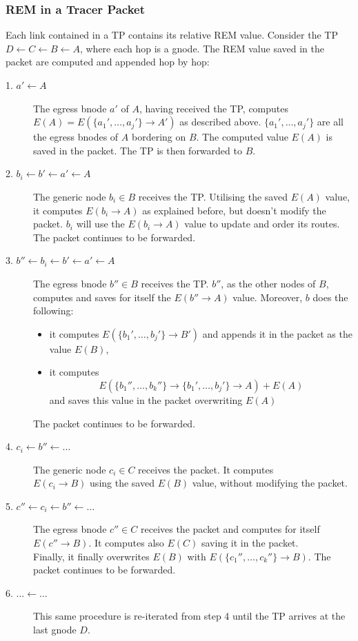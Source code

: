 \documentclass[a4paper]{article}
\begin{document}
\subsubsection{REM in a Tracer Packet}
Each link contained in a TP contains its relative REM value. Consider the TP
$D \leftarrow  C \leftarrow   B \leftarrow   A$, where each hop is a gnode.
The REM value saved in the packet are computed and appended hop by hop:
\begin{description}
	\item[1. $a'\leftarrow A\;$] The egress bnode $a'$ of $A$, having received the
		TP, computes\\ $E(A)=E(\{a_1',\dots,a_j'\}\rightarrow A')$ as
		described above. $\{a_1',\dots,a_j'\}$ are all the egress bnodes of
		$A$ bordering on $B$. The computed value $E(A)$ is saved in the
		packet. The TP is then forwarded to $B$.
	\item[2. $b_i\leftarrow b'\leftarrow a' \leftarrow A\;$] The generic node
		$b_i \in B$ receives the TP. Utilising the saved $E(A)$ value,
		it computes $E(b_i\rightarrow A)$ as explained before, but doesn't modify the
		packet. $b_i$ will use the $E(b_i\rightarrow A)$ value to
		update and order its routes.\\
		The packet continues to be forwarded.
	\item[3. $b'' \leftarrow b_i \leftarrow b' \leftarrow a' \leftarrow
		A\;\;$] The egress bnode $b'' \in B$ receives the TP. $b''$, as
		the other nodes of $B$, computes and saves for itself the
		$E(b''\rightarrow A)$ value. Moreover, $b$ does the following:
		\begin{itemize}
			\item it computes $E(\{b_1',\dots,b_j'\}\rightarrow B')$
				and appends it in the packet as the value
				$E(B)$,
			\item it computes \[
				E(\{b_1'',\dots,b_k''\}\rightarrow
				\{b_1',\dots,b_j'\} \rightarrow A)+E(A)
				\]
				and saves this value in the packet overwriting
				$E(A)$
		\end{itemize}
		The packet continues to be forwarded.
	\item[4. $c_i\leftarrow b''\leftarrow \dots\;$] The generic node $c_i \in
		C$ receives the packet. It computes \\$E(c_i \rightarrow B)$
		using the saved $E(B)$ value, without modifying the packet.
	\item[5. $c''\leftarrow c_i \leftarrow b''\leftarrow \dots\;$] The egress
		bnode $c'' \in C$ receives the packet and computes for itself
		$E(c''\rightarrow B)$. It computes also $E(C)$ saving it in
		the packet.\\
		Finally, it finally overwrites $E(B)$ with
		$E(\{c_1'',\dots,c_k''\}\rightarrow B)$.
		The packet continues to be forwarded.
	\item[6. $\dots\leftarrow \dots\;$] This same procedure is re-iterated
		from step 4 until the TP arrives at the last gnode $D$.
\end{description}
\end{document}
